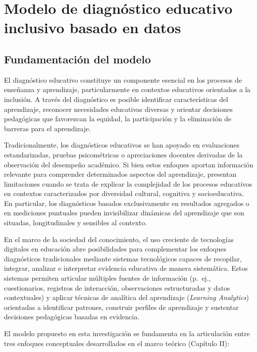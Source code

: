 \chapter{Modelo de diagnóstico educativo inclusivo basado en datos}

\begin{refsection}


\section{Fundamentación del modelo}

El diagnóstico educativo constituye un componente esencial en los procesos de enseñanza y aprendizaje, particularmente en contextos educativos orientados a la inclusión. A través del diagnóstico es posible identificar características del aprendizaje, reconocer necesidades educativas diversas y orientar decisiones pedagógicas que favorezcan la equidad, la participación y la eliminación de barreras para el aprendizaje.

Tradicionalmente, los diagnósticos educativos se han apoyado en evaluaciones estandarizadas, pruebas psicométricas o apreciaciones docentes derivadas de la observación del desempeño académico. Si bien estos enfoques aportan información relevante para comprender determinados aspectos del aprendizaje, presentan limitaciones cuando se trata de explicar la complejidad de los procesos educativos en contextos caracterizados por diversidad cultural, cognitiva y socioeducativa. En particular, los diagnósticos basados exclusivamente en resultados agregados o en mediciones puntuales pueden invisibilizar dinámicas del aprendizaje que son situadas, longitudinales y sensibles al contexto.

En el marco de la sociedad del conocimiento, el uso creciente de tecnologías digitales en educación abre posibilidades para complementar los enfoques diagnósticos tradicionales mediante sistemas tecnológicos capaces de recopilar, integrar, analizar e interpretar evidencia educativa de manera sistemática. Estos sistemas permiten articular múltiples fuentes de información (p.\ ej., cuestionarios, registros de interacción, observaciones estructuradas y datos contextuales) y aplicar técnicas de analítica del aprendizaje (\textit{Learning Analytics}) orientadas a identificar patrones, construir perfiles de aprendizaje y sustentar decisiones pedagógicas basadas en evidencia.

El modelo propuesto en esta investigación se fundamenta en la articulación entre tres enfoques conceptuales desarrollados en el marco teórico (Capítulo II):


\end{refsection}

